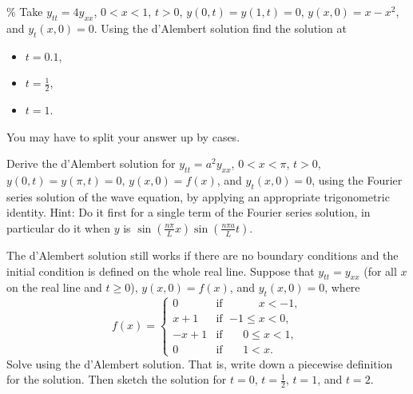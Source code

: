 \documentclass{ximera}
\begin{document}
\begin{exercise}\%
    Take $y_{tt} = 4y_{xx}$, $0 < x < 1$, $t > 0$, $y(0,t) = y(1, t) = 0$, $y(x,0) = x-x^2$, and $y_t(x,0) = 0$.  Using the d'Alembert solution find the solution at
    \begin{itemize}
        \item $t=0.1$,
        \item $t=\frac{1}{2}$,
        \item $t=1$.
    \end{itemize}
    You may have to split your answer up by cases.
\end{exercise}

\begin{exercise}
    Derive the d'Alembert solution for $y_{tt} = a^2 y_{xx}$, $0 < x < \pi$, $t > 0$, $y(0,t) = y(\pi, t) = 0$, $y(x,0) = f(x)$, and $y_t(x,0) = 0$, using the Fourier series solution of the wave equation, by applying an appropriate trigonometric identity. Hint: Do it first for a single term of the Fourier series solution, in particular do it when $y$ is $\sin\left(\frac{n \pi}{L} x \right)\sin\left(\frac{n \pi a}{L} t \right)$.
\end{exercise}

\begin{exercise}
    The d'Alembert solution still works if there are no boundary conditions and the initial condition is defined on the whole real line.  Suppose that $y_{tt} = y_{xx}$ (for all $x$ on the real line and $t \geq 0$), $y(x,0) = f(x)$, and $y_t(x,0) = 0$, where
    \begin{equation*}
        f(x) =
        \begin{cases}
            0 & \text{if } \; \phantom{{-1} \leq {} }x < -1, \\
            x+1 & \text{if } \; {-1} \leq x < 0, \\
            -x+1 & \text{if } \; \phantom{-}0 \leq x < 1, \\
            0 & \text{if } \; \phantom{-}1 < x .
        \end{cases}
    \end{equation*}
    Solve using the d'Alembert solution. That is, write down a piecewise definition for the solution.  Then sketch the solution for $t=0$, $t=\frac{1}{2}$, $t=1$, and $t=2$.
\end{exercise}
\end{document}
